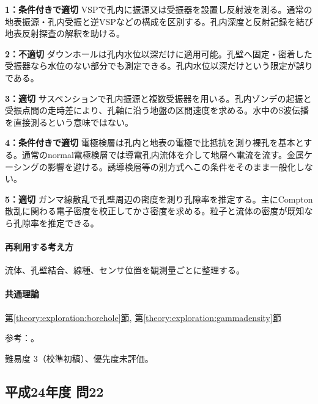 \noindent\textbf{1：条件付きで適切} VSPで孔内に振源又は受振器を設置し反射波を測る。通常の地表振源・孔内受振と逆VSPなどの構成を区別する。孔内深度と反射記録を結び地表反射探査の解釈を助ける。\par

\noindent\textbf{2：不適切} ダウンホールは孔内水位以深だけに適用可能。孔壁へ固定・密着した受振器なら水位のない部分でも測定できる。孔内水位以深だけという限定が誤りである。\par

\noindent\textbf{3：適切} サスペンションで孔内振源と複数受振器を用いる。孔内ゾンデの起振と受振点間の走時差により、孔軸に沿う地盤の区間速度を求める。水中のS波伝播を直接測るという意味ではない。\par

\noindent\textbf{4：条件付きで適切} 電極検層は孔内と地表の電極で比抵抗を測り裸孔を基本とする。通常のnormal電極検層では導電孔内流体を介して地層へ電流を流す。金属ケーシングの影響を避ける。誘導検層等の別方式へこの条件をそのまま一般化しない。\par

\noindent\textbf{5：適切} ガンマ線散乱で孔壁周辺の密度を測り孔隙率を推定する。主にCompton散乱に関わる電子密度を校正してかさ密度を求める。粒子と流体の密度が既知なら孔隙率を推定できる。\par

\paragraph{再利用する考え方} 流体、孔壁結合、線種、センサ位置を観測量ごとに整理する。

\paragraph{共通理論} \hyperref[theory:exploration:borehole]{第\ref*{theory:exploration:borehole}節}, \hyperref[theory:exploration:gammadensity]{第\ref*{theory:exploration:gammadensity}節}

\par 参考：\cite{epa_borehole_resistivity,epa_gamma_density,geebec_ps,oyo_suspension}。

\par 難易度 3（校準初稿）、優先度未評価。

\subsection{平成24年度 問22}
\label{q:h24-reg-applied-22}

